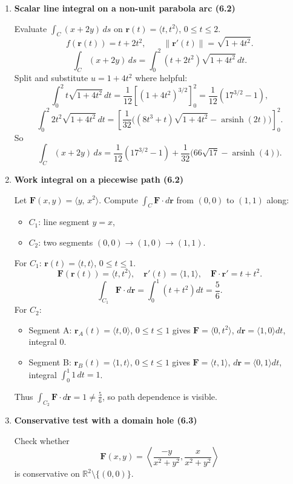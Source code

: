 \documentclass[12pt, twoside]{article}
\begin{document}
\begin{enumerate}[leftmargin=*, itemsep=1em]
\item \textbf{Scalar line integral on a non-unit parabola arc (6.2)}

Evaluate $\int_C (x+2y)\,ds$ on $\mathbf{r}(t)=\langle t,t^2\rangle$, $0\le t\le 2$.
\[
f(\mathbf{r}(t))=t+2t^2,
\qquad \|\mathbf{r}'(t)\|=\sqrt{1+4t^2}.
\]
\[
\int_C (x+2y)\,ds=\int_0^2 (t+2t^2)\sqrt{1+4t^2}\,dt.
\]
Split and substitute $u=1+4t^2$ where helpful:
\[
\int_0^2 t\sqrt{1+4t^2}\,dt=\frac{1}{12}\left[(1+4t^2)^{3/2}\right]_0^2=\frac{1}{12}(17^{3/2}-1),
\]
\[
\int_0^2 2t^2\sqrt{1+4t^2}\,dt
=\left[\frac{1}{32}\Big((8t^3+t)\sqrt{1+4t^2}-\operatorname{arsinh}(2t)\Big)\right]_0^2.
\]
So
\[
\int_C (x+2y)\,ds
=\frac{1}{12}(17^{3/2}-1)
+\frac{1}{32}\Big(66\sqrt{17}-\operatorname{arsinh}(4)\Big).
\]

\item \textbf{Work integral on a piecewise path (6.2)}

Let $\mathbf{F}(x,y)=\langle y,\,x^2\rangle$. Compute $\int_C\mathbf{F}\cdot d\mathbf{r}$ from $(0,0)$ to $(1,1)$ along:
\begin{itemize}[leftmargin=*]
  \item $C_1$: line segment $y=x$,
  \item $C_2$: two segments $(0,0)\to(1,0)\to(1,1)$.
\end{itemize}
For $C_1$: $\mathbf{r}(t)=\langle t,t\rangle$, $0\le t\le1$.
\[
\mathbf{F}(\mathbf{r}(t))=\langle t,t^2\rangle,
\quad \mathbf{r}'(t)=\langle1,1\rangle,
\quad \mathbf{F}\cdot\mathbf{r}'=t+t^2.
\]
\[
\int_{C_1}\mathbf{F}\cdot d\mathbf{r}=\int_0^1(t+t^2)dt=\frac{5}{6}.
\]
For $C_2$:
\begin{itemize}[leftmargin=*]
  \item Segment A: $\mathbf{r}_A(t)=\langle t,0\rangle$, $0\le t\le1$ gives $\mathbf{F}=\langle0,t^2\rangle$, $d\mathbf{r}=\langle1,0\rangle dt$, integral $0$.
  \item Segment B: $\mathbf{r}_B(t)=\langle1,t\rangle$, $0\le t\le1$ gives $\mathbf{F}=\langle t,1\rangle$, $d\mathbf{r}=\langle0,1\rangle dt$, integral $\int_0^1 1\,dt=1$.
\end{itemize}
Thus $\int_{C_2}\mathbf{F}\cdot d\mathbf{r}=1\ne\frac{5}{6}$, so path dependence is visible.

\item \textbf{Conservative test with a domain hole (6.3)}

Check whether
\[
\mathbf{F}(x,y)=\left\langle\frac{-y}{x^2+y^2},\frac{x}{x^2+y^2}\right\rangle
\]
is conservative on $\mathbb{R}^2\setminus\{(0,0)\}$.


\end{enumerate}
\end{document}
